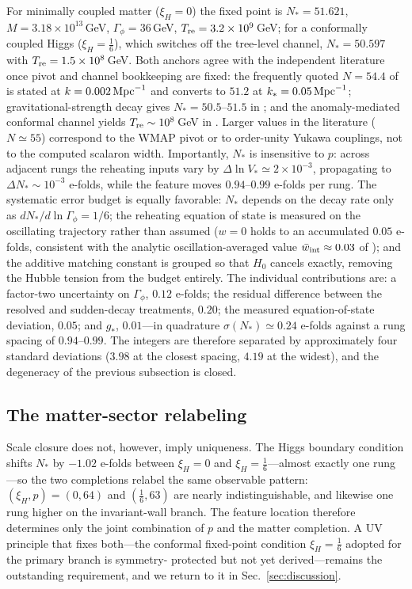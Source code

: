 \documentclass[aps,prd,twocolumn,superscriptaddress,nofootinbib,longbibliography]{revtex4-2}
\newcommand{\Mpc}{\,{\rm Mpc}^{-1}}
\begin{document}
For minimally coupled matter ($\xi_H=0$) the fixed point is
$N_*=51.621$, $M=3.18\times10^{13}\,$GeV, $\Gamma_\phi=36\,$GeV,
$T_{\rm re}=3.2\times10^{9}\,$GeV; for a conformally coupled Higgs
($\xi_H=\tfrac16$), which switches off the tree-level channel,
$N_*=50.597$ with $T_{\rm re}=1.5\times10^{8}\,$GeV. Both anchors agree
with the independent literature once pivot and channel bookkeeping are
fixed: the frequently quoted $N=54.4$ of \cite{BezrukovGorbunov2011} is
stated at $k=0.002\Mpc$ and converts to $51.2$ at $k_*=0.05\Mpc$;
gravitational-strength decay gives $N_*=50.5$--$51.5$ in
\cite{Ellis2015}; and the anomaly-mediated conformal channel yields
$T_{\rm re}\sim10^{8}\,$GeV in \cite{Ema2024}. Larger values in the
literature ($N\simeq55$) correspond to the WMAP pivot or to order-unity
Yukawa couplings, not to the computed scalaron width. Importantly, $N_*$ is insensitive to $p$: across adjacent rungs the
reheating inputs vary by $\Delta\ln V_*\simeq2\times10^{-3}$, propagating to
$\Delta N_*\sim10^{-3}$ e-folds, while the feature moves $0.94$--$0.99$ e-folds
per rung. The systematic error budget is equally favorable: $N_*$ depends on the
decay rate only as $dN_*/d\ln\Gamma_\phi=1/6$; the reheating equation of state
is measured on the oscillating trajectory rather than assumed ($w=0$ holds to
an accumulated $0.05$ e-folds, consistent with the analytic
oscillation-averaged value $\bar w_{\rm int}\approx0.03$ of
\cite{Ellis2015}); and the additive matching constant is grouped
so that $H_0$ cancels exactly, removing the Hubble tension from the budget
entirely. The individual contributions are: a factor-two uncertainty on
$\Gamma_\phi$, $0.12$ e-folds; the residual difference between the resolved
and sudden-decay treatments, $0.20$; the measured equation-of-state
deviation, $0.05$; and $g_*$, $0.01$---in quadrature
$\sigma(N_*)\simeq0.24$ e-folds against a rung spacing of $0.94$--$0.99$. The
integers are therefore separated by approximately four standard deviations
($3.98$ at the closest spacing, $4.19$ at the widest), and
the degeneracy of the previous subsection is closed.

\subsection{The matter-sector relabeling}
\label{sec:relabeling}
Scale closure does not, however, imply uniqueness. The Higgs boundary
condition shifts
$N_*$ by $-1.02$ e-folds between $\xi_H=0$ and $\xi_H=\tfrac16$---almost
exactly one rung---so the two completions relabel the same observable
pattern: $(\xi_H,p)=(0,64)$ and $(\tfrac16,63)$ are nearly indistinguishable,
and likewise one rung higher on the invariant-wall branch. The feature
location therefore determines only the joint combination of $p$ and the
matter completion. A UV principle that fixes both---the conformal fixed-point
condition $\xi_H=\tfrac16$ adopted for the primary branch is symmetry-%
protected but not yet derived---remains the outstanding requirement, and we
return to it in Sec.~\ref{sec:discussion}.
\end{document}
